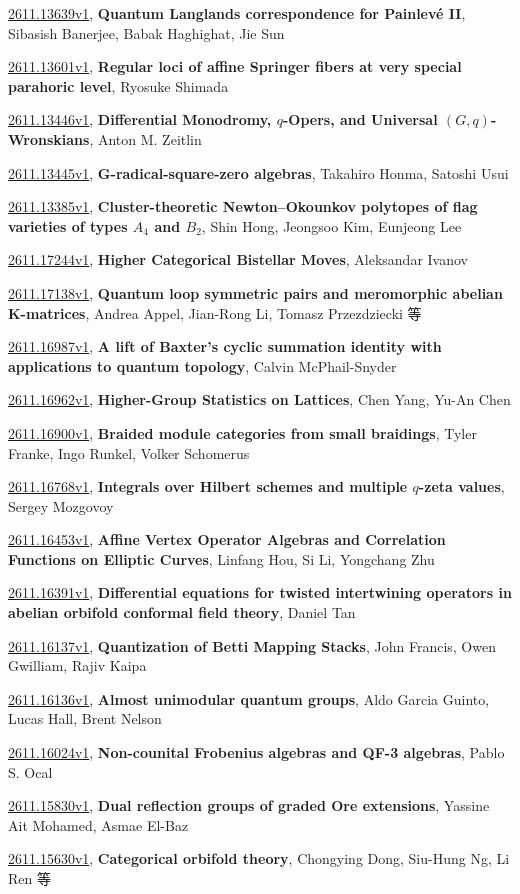 \documentclass[9pt, a4paper]{article}
\theoremstyle{plain}
\theoremstyle{definition}
\theoremstyle{remark}
\newcommand{\arxiv}[3]{\href{https://arxiv.org/abs/#1}{#1}, \textbf{\textcolor{arxivblue}{#2}}, #3}
\begin{document}
\arxiv{2611.13639v1}{Quantum Langlands correspondence for Painlevé II}{Sibasish Banerjee, Babak Haghighat, Jie Sun}

\arxiv{2611.13601v1}{Regular loci of affine Springer fibers at very special parahoric level}{Ryosuke Shimada}

\arxiv{2611.13446v1}{Differential Monodromy, $q$-Opers, and Universal $(G,q)$-Wronskians}{Anton M. Zeitlin}

\arxiv{2611.13445v1}{G-radical-square-zero algebras}{Takahiro Honma, Satoshi Usui}

\arxiv{2611.13385v1}{Cluster-theoretic Newton--Okounkov polytopes of flag varieties of types $A_4$ and $B_2$}{Shin Hong, Jeongsoo Kim, Eunjeong Lee}

\arxiv{2611.17244v1}{Higher Categorical Bistellar Moves}{Aleksandar Ivanov}

\arxiv{2611.17138v1}{Quantum loop symmetric pairs and meromorphic abelian K-matrices}{Andrea Appel, Jian-Rong Li, Tomasz Przezdziecki 等}

\arxiv{2611.16987v1}{A lift of Baxter's cyclic summation identity with applications to quantum topology}{Calvin McPhail-Snyder}

\arxiv{2611.16962v1}{Higher-Group Statistics on Lattices}{Chen Yang, Yu-An Chen}

\arxiv{2611.16900v1}{Braided module categories from small braidings}{Tyler Franke, Ingo Runkel, Volker Schomerus}

\arxiv{2611.16768v1}{Integrals over Hilbert schemes and multiple $q$-zeta values}{Sergey Mozgovoy}

\arxiv{2611.16453v1}{Affine Vertex Operator Algebras and Correlation Functions on Elliptic Curves}{Linfang Hou, Si Li, Yongchang Zhu}

\arxiv{2611.16391v1}{Differential equations for twisted intertwining operators in abelian orbifold conformal field theory}{Daniel Tan}

\arxiv{2611.16137v1}{Quantization of Betti Mapping Stacks}{John Francis, Owen Gwilliam, Rajiv Kaipa}

\arxiv{2611.16136v1}{Almost unimodular quantum groups}{Aldo Garcia Guinto, Lucas Hall, Brent Nelson}

\arxiv{2611.16024v1}{Non-counital Frobenius algebras and QF-3 algebras}{Pablo S. Ocal}

\arxiv{2611.15830v1}{Dual reflection groups of graded Ore extensions}{Yassine Ait Mohamed, Asmae El-Baz}

\arxiv{2611.15630v1}{Categorical orbifold theory}{Chongying Dong, Siu-Hung Ng, Li Ren 等}
\end{document}
